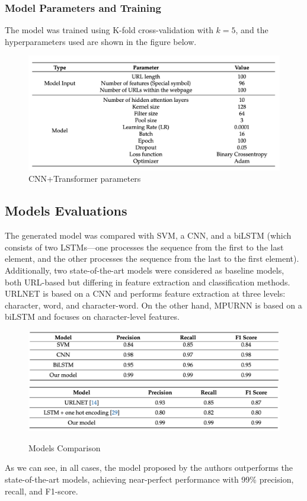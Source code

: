 \subsubsection{Model Parameters and Training}
The model was trained using K-fold cross-validation with \(k = 5\), and the hyperparameters used are shown in the figure below.

\begin{figure}[htp]
    \centering
    \includegraphics[width=1\linewidth]{images/Transformer parameters.png}
    \caption{CNN+Transformer parameters}
    \label{fig:CNN+Transformer parameters}
\end{figure}

\subsection{Models Evaluations}
 The generated model was compared with SVM, a CNN, and a biLSTM (which consists of two LSTMs—one processes the sequence from the first to the last element, and the other processes the sequence from the last to the first element). Additionally, two state-of-the-art models were considered as baseline models, both URL-based but differing in feature extraction and classification methods. URLNET is based on a CNN and performs feature extraction at three levels: character, word, and character-word. On the other hand, MPURNN is based on a biLSTM and focuses on character-level features.
\begin{figure}[htp]
    \centering
    \includegraphics[width=1\linewidth]{images/TransformerComparison1.png}
    \includegraphics[width=1\linewidth]{images/TransformerComparison2.png}
    \caption{Models Comparison}
    \label{fig:Models Comparison}
\end{figure}
As we can see, in all cases, the model proposed by the authors outperforms the state-of-the-art models, achieving near-perfect performance with 99\% precision, recall, and F1-score.